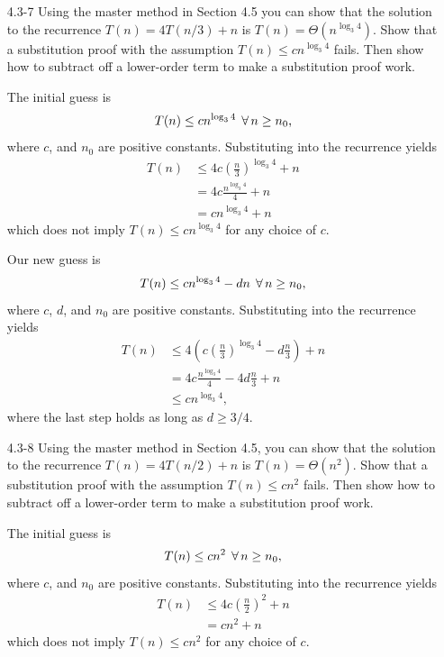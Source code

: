 \begin{enumerate}
\item[4.3{-}7]{Using the master method in Section 4.5 you can show that the
solution to the recurrence $T(n) = 4T(n/3) + n$ is
$T(n) = \Theta(n^{\log_3 4})$. Show that a substitution proof with the
assumption $T(n) \le c n^{\log_3 4}$ fails. Then show how to subtract off a
lower-order term to make a substitution proof work.}

\begin{framed}
The initial guess is
\[
T(n) \le c n^{\log_3 4} \; \operatorname{\forall} n \ge n_0,
\]
where $c$, and $n_0$ are positive constants. Substituting into the
recurrence yields
\begin{equation*}
\begin{aligned}
T(n) &\le 4 c \left(\frac{n}{3}\right)^{\log_3 4} + n\\
     &= 4 c \frac{n^{\log_3 4}}{4} + n\\
     &= c n^{\log_3 4} + n
\end{aligned}
\end{equation*}
which does not imply $T(n) \le c n^{\log_3 4}$ for any choice of $c$.

Our new guess is
\[
T(n) \le c n^{\log_3 4} - dn \; \operatorname{\forall} n \ge n_0,
\]
where $c$, $d$, and $n_0$ are positive constants. Substituting into the
recurrence yields
\begin{equation*}
\begin{aligned}
T(n) &\le 4 \left(c \left(\frac{n}{3}\right)^{\log_3 4} - d \frac{n}{3}\right) + n\\
     &= 4 c \frac{n^{\log_3 4}}{4} - 4d \frac{n}{3} + n\\
     &\le c n^{\log_3 4},
\end{aligned}
\end{equation*}
where the last step holds as long as $d \ge 3/4$.
\end{framed}

\item[4.3{-}8]{Using the master method in Section 4.5, you can show that the
solution to the recurrence $T(n) = 4T(n/2) + n$ is $T(n) = \Theta(n^2)$. Show
that a substitution proof with the assumption $T(n) \le cn^2$ fails. Then show
how to subtract off a lower-order term to make a substitution proof work.}

\begin{framed}
The initial guess is
\[
T(n) \le c n^2 \; \operatorname{\forall} n \ge n_0,
\]
where $c$, and $n_0$ are positive constants. Substituting into the
recurrence yields
\begin{equation*}
\begin{aligned}
T(n) &\le 4 c \left(\frac{n}{2}\right)^2 + n\\
     &= c n^2 + n
\end{aligned}
\end{equation*}
which does not imply $T(n) \le c n^2$ for any choice of $c$.


\end{framed}
\end{enumerate}
